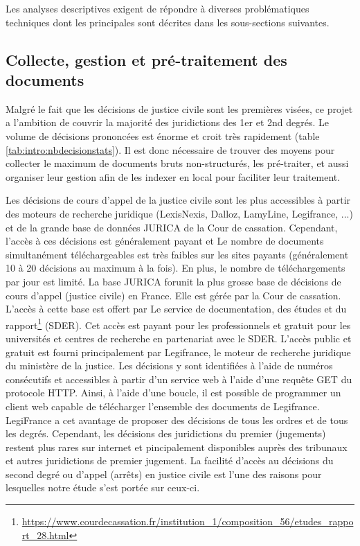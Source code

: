 Les analyses descriptives exigent de répondre à diverses problématiques techniques dont les principales sont décrites dans les sous-sections suivantes.

\subsection{Collecte, gestion et pré-traitement des documents}

Malgré le fait que les décisions de justice civile sont les premières visées, ce projet a l'ambition de couvrir la majorité des juridictions des 1er et 2nd degrés. Le volume de décisions prononcées est énorme et croit très rapidement (table \ref{tab:intro:nbdecisionstats}). Il est donc nécessaire de trouver des moyens pour collecter le maximum de documents bruts non-structurés, les pré-traiter, et aussi organiser leur gestion afin de les indexer en local pour faciliter leur traitement.

Les décisions de cours d'appel de la justice civile sont les plus accessibles à partir des moteurs de recherche juridique (LexisNexis, 
Dalloz, LamyLine, Legifrance, ...) et de la grande base de données JURICA de la Cour de cassation. Cependant, l'accès à ces décisions est généralement payant et Le nombre de documents simultanément téléchargeables est très faibles sur les sites payants (généralement 10 à 20 décisions au maximum à la fois). En plus, le nombre de téléchargements par jour est limité. La base JURICA forunit la plus grosse base de décisions de cours d'appel (justice civile) en France. Elle est gérée par la Cour de cassation. L'accès à cette base est offert par Le service de documentation, des études et du rapport\footnote{\url{https://www.courdecassation.fr/institution_1/composition_56/etudes_rapport_28.html}} (SDER). Cet accès est payant pour les professionnels et gratuit pour les universités et centres de recherche en partenariat avec le SDER. L'accès public et gratuit est fourni principalement par Legifrance, le moteur de recherche juridique du ministère de la justice. Les décisions y sont identifiées à l'aide de numéros consécutifs et accessibles à partir d'un service web à l'aide d'une requête GET du protocole HTTP. Ainsi, à l'aide d'une boucle, il est possible de programmer un client web capable de télécharger l'ensemble des documents de Legifrance. LegiFrance a cet avantage de proposer des décisions de tous les ordres et de tous les degrés. Cependant, les décisions des juridictions du premier (jugements) restent plus rares sur internet et pincipalement disponibles auprès des tribunaux et autres juridictions de premier jugement.  La facilité d'accès au décisions du second degré ou d'appel (arrêts) en justice civile est l'une des raisons pour lesquelles notre étude s'est portée sur ceux-ci.

